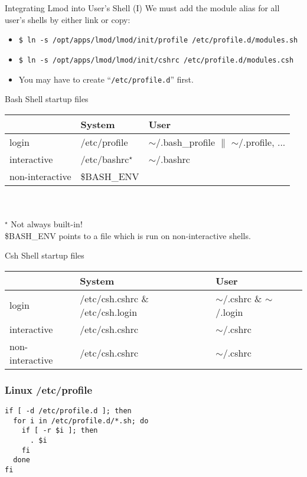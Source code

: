 \documentclass{beamer}
\begin{document}
\begin{frame}{Integrating Lmod into User's Shell (I)}
    We must add the module alias for all user's shells by either link
    or copy:
    \begin{itemize}
      \item \texttt{\$ ln -s /opt/apps/lmod/lmod/init/profile /etc/profile.d/modules.sh}
      \item \texttt{\$ ln -s /opt/apps/lmod/lmod/init/cshrc   /etc/profile.d/modules.csh}
      \item You may have to create ``\texttt{/etc/profile.d}'' first.
  \end{itemize}
\end{frame}

\begin{frame}{Bash Shell startup files}
    \begin{tabular}{|l|l|l|}
        \hline
        ~           & System       & User \\\hline\hline
        login       & /etc/profile & $\sim$/.bash\_profile $\parallel$ $\sim$/.profile, ...\\\hline
        interactive & {\color{red}/etc/bashrc}$^\star$  & $\sim$/.bashrc\\\hline
        non-interactive & \$BASH\_ENV  & ~\\\hline
    \end{tabular}
    ~\\
    ~\\
    $^\star$ Not always built-in!\\
    \$BASH\_ENV points to a file which is run on  non-interactive shells.
\end{frame}

\begin{frame}{Csh Shell startup files}
{\small
    \begin{tabular}{|l|l|l|}
        \hline
        ~           & System       & User \\\hline\hline
        login       & /etc/csh.cshrc \& /etc/csh.login &  $\sim$/.cshrc  \& $\sim$/.login\\\hline
        interactive & /etc/csh.cshrc  & $\sim$/.cshrc\\\hline
        non-interactive & /etc/csh.cshrc & $\sim$/.cshrc~\\\hline
    \end{tabular}
}
\end{frame}

\begin{frame}[fragile]
    \frametitle{Linux /etc/profile}
    {
\begin{verbatim}
if [ -d /etc/profile.d ]; then
  for i in /etc/profile.d/*.sh; do
    if [ -r $i ]; then
      . $i
    fi
  done
fi
\end{verbatim}
    }
\end{frame}
\end{document}
